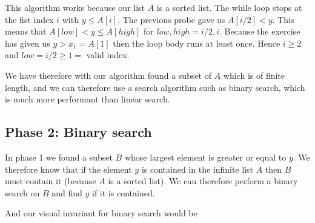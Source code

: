 \documentclass{article}
\begin{document}
This algorithm works because our list $A$ is a sorted list. The while loop stops at the fist index $i$ with $y \leq A[i]$. The previous probe gave us $A[i/2] < y$. This means that $A[low] <y \leq A[high]$ for $low, high = i/2, i$. Because the exercise has given us $y >x_1 = A[1]$ then the loop body runs at least once. Hence $i \geq 2$ and $low=i/2 \geq 1 = $ valid index.

We have therefore with our algorithm found a subset of $A$ which is of finite length, and we can therefore use a search algorithm such as binary search, which is much more performant than linear search.


\subsection*{Phase 2: Binary search}
In phase 1 we found a subset $B$ whose largest element is greater or equal to $y$. We therefore know that if the element $y$ is contained in the infinite list $A$ then $B$ must contain it (because $A$ is a sorted list). We can therefore perform a binary search on $B$ and find $y$ if it is contained.





%
%
\begin{center}
	\begin{minipage}{8.8cm}
		\begin{algorithmic}
			\Else
			\EndIf
			\EndWhile
			\EndProcedure
		\end{algorithmic}
	\end{minipage}
\end{center}

And our visual invariant for binary search would be
\end{document}
